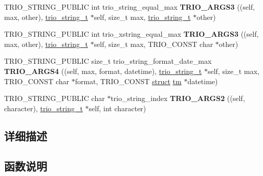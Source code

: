 \begin{DoxyCompactItemize}
\item 
\mbox{\label{group___dynamic_strings_ga81f351c32d5dcea4424766dc08c55db7}} 
T\+R\+I\+O\+\_\+\+S\+T\+R\+I\+N\+G\+\_\+\+P\+U\+B\+L\+IC int trio\+\_\+string\+\_\+equal\+\_\+max {\bfseries T\+R\+I\+O\+\_\+\+A\+R\+G\+S3} ((self, max, other), \hyperlink{struct__trio__string__t}{trio\+\_\+string\+\_\+t} $\ast$self, size\+\_\+t max, \hyperlink{struct__trio__string__t}{trio\+\_\+string\+\_\+t} $\ast$other)
\item 
\mbox{\label{group___dynamic_strings_ga0908ce062607606e53f6938dd97214f7}} 
T\+R\+I\+O\+\_\+\+S\+T\+R\+I\+N\+G\+\_\+\+P\+U\+B\+L\+IC int trio\+\_\+xstring\+\_\+equal\+\_\+max {\bfseries T\+R\+I\+O\+\_\+\+A\+R\+G\+S3} ((self, max, other), \hyperlink{struct__trio__string__t}{trio\+\_\+string\+\_\+t} $\ast$self, size\+\_\+t max, T\+R\+I\+O\+\_\+\+C\+O\+N\+ST char $\ast$other)
\item 
\mbox{\label{group___dynamic_strings_gaf57ea089a2147d25980e33b4e88ba0ce}} 
T\+R\+I\+O\+\_\+\+S\+T\+R\+I\+N\+G\+\_\+\+P\+U\+B\+L\+IC size\+\_\+t trio\+\_\+string\+\_\+format\+\_\+date\+\_\+max {\bfseries T\+R\+I\+O\+\_\+\+A\+R\+G\+S4} ((self, max, format, datetime), \hyperlink{struct__trio__string__t}{trio\+\_\+string\+\_\+t} $\ast$self, size\+\_\+t max, T\+R\+I\+O\+\_\+\+C\+O\+N\+ST char $\ast$format, T\+R\+I\+O\+\_\+\+C\+O\+N\+ST \hyperlink{interfacestruct}{struct} \hyperlink{structtm}{tm} $\ast$datetime)
\item 
\mbox{\label{group___dynamic_strings_ga39392c0e3f35782f7b34bdcddc289765}} 
T\+R\+I\+O\+\_\+\+S\+T\+R\+I\+N\+G\+\_\+\+P\+U\+B\+L\+IC char $\ast$trio\+\_\+string\+\_\+index {\bfseries T\+R\+I\+O\+\_\+\+A\+R\+G\+S2} ((self, character), \hyperlink{struct__trio__string__t}{trio\+\_\+string\+\_\+t} $\ast$self, int character)
\end{DoxyCompactItemize}


\subsection{详细描述}


\subsection{函数说明}
\mbox{\label{group___dynamic_strings_gaa88b356493c359ca876cf89cab5bef1e}} 
